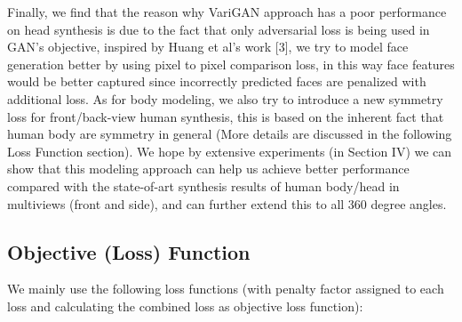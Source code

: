 \documentclass[10pt,conference]{IEEEtran}
\begin{document}
Finally, we find that the reason why VariGAN approach has a poor performance on head synthesis is due to the fact that only adversarial loss is being used in GAN's objective, inspired by Huang et al's work [3], we try to model face generation better by using pixel to pixel comparison loss, in this way face features would be better captured since incorrectly predicted faces are penalized with additional loss. As for body modeling, we also try to introduce a new symmetry loss for front/back-view human synthesis, this is based on the inherent fact that human body are symmetry in general (More details are discussed in the following Loss Function section). We hope by extensive experiments (in Section IV) we can show that this modeling approach can help us achieve better performance compared with the state-of-art synthesis results of human body/head in multiviews (front and side), and can further extend this to all 360 degree angles.

\subsection{Objective (Loss) Function}
We mainly use the following loss functions (with penalty factor assigned to each loss and calculating the combined loss as objective loss function):
\end{document}
